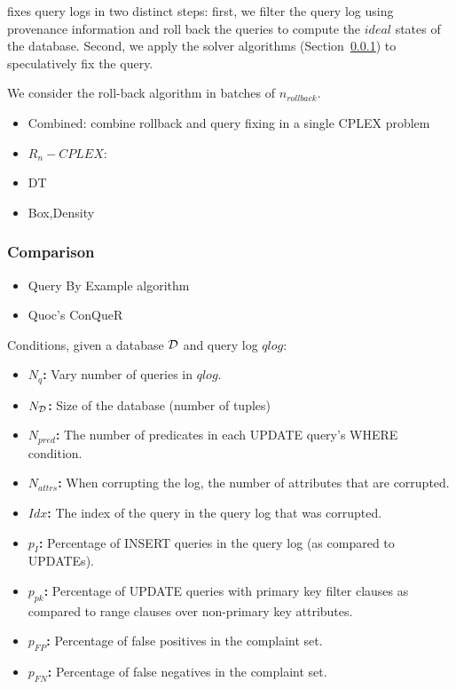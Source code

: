 \sys fixes query logs in two distinct steps: first, we filter the query log using 
provenance information and roll back the queries to compute the $ideal$ states of the database.
Second, we apply the solver algorithms (Section~\ref{}) to speculatively fix the query.

We consider the roll-back algorithm in batches of $n_{rollback}$.

\begin{itemize}
\item Combined:  combine rollback and query fixing in a single CPLEX problem
\item $R_n-CPLEX$: 
\item DT
\item Box,Density
\end{itemize}



\subsubsection{Comparison}

\begin{itemize}
\item Query By Example algorithm
\item Quoc's ConQueR
\end{itemize}

Conditions, given a database ${\cal D}$ and query log $qlog$:

\begin{itemize}
\item {\bf $N_q$:} Vary number of queries in $qlog$.
\item {\bf $N_{\cal D}$: } Size of the database (number of tuples)
\item {\bf $N_{pred}$:} The number of predicates in each UPDATE query's WHERE condition.
\item {\bf $N_{attrs}$: } When corrupting the log, the number of attributes that are corrupted.
\item {\bf $Idx$: } The index of the query in the query log that was corrupted.
\item {\bf $p_{I}$: } Percentage of INSERT queries in the query log (as compared to UPDATEs).
\item {\bf $p_{pk}$: } Percentage of UPDATE queries with primary key filter clauses as compared to range clauses over non-primary key attributes.
\item {\bf $p_{FP}$: } Percentage of false positives in the complaint set.
\item {\bf $p_{FN}$: } Percentage of false negatives in the complaint set.
\end{itemize}


